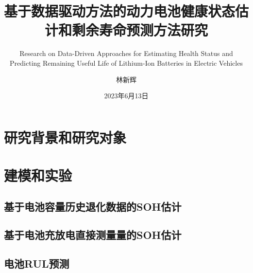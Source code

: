 \documentclass{beamer}
\author{林新辉}
\title{基于数据驱动方法的动力电池健康状态估计和剩余寿命预测方法研究}
\subtitle{Research on Data-Driven Approaches for Estimating Health Status and Predicting Remaining Useful Life of Lithium-Ion Batteries in Electric Vehicles}
\institute{控制与计算机工程学院，华北电力大学}
\date{2023年6月13日}
\begin{document}
\kaishu
\begin{frame}
\titlepage
\end{frame}
\begin{frame}
\tableofcontents[sectionstyle=show,subsectionstyle=show/shaded/hide,subsubsectionstyle=show/shaded/hide]
\end{frame}

\section{研究背景和研究对象}


\section{建模和实验}

\subsection{基于电池容量历史退化数据的SOH估计}

\subsection{基于电池充放电直接测量量的SOH估计}

\subsection{电池RUL预测}


\end{document}
